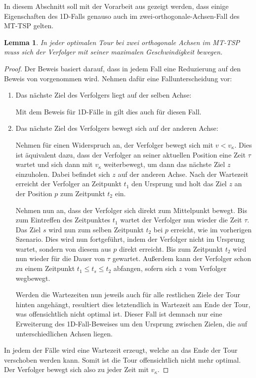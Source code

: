 \documentclass[german,version-2019-11]{uzl-thesis}
\newtheorem{lem}{Lemma}
\begin{document}
In diesem Abschnitt soll mit der Vorarbeit aus \cite{helvig} gezeigt werden, dass einige Eigenschaften des 1D-Falls genauso auch im zwei-orthogonale-Achsen-Fall des MT-TSP gelten.

\begin{lem}
\label{lem:1}
In jeder optimalen Tour bei zwei orthogonale Achsen im MT-TSP muss sich der Verfolger mit seiner  maximalen Geschwindigkeit bewegen.
\end{lem}
 
\begin{proof}
Der Beweis basiert darauf, dass in jedem Fall eine Reduzierung auf den Beweis von \cite{helvig} vorgenommen wird. Nehmen dafür eine Fallunterscheidung vor:
\begin{enumerate}
\item Das nächste Ziel des Verfolgers liegt auf der selben Achse:

Mit dem Beweis für 1D-Fälle in \cite{helvig} gilt dies auch für diesen Fall.\\

\item Das nächste Ziel des Verfolgers bewegt sich auf der anderen Achse: 

Nehmen für einen Widerspruch an, der Verfolger bewegt sich mit $v < v_{\kappa}$. Dies ist äquivalent dazu, dass der Verfolger an seiner aktuellen Position eine Zeit $\tau$ wartet und sich dann mit $v_{\kappa}$ weiterbewegt, um dann das nächste Ziel $z$ einzuholen. Dabei befindet sich $z$ auf der anderen Achse. Nach der Wartezeit erreicht der Verfolger an Zeitpunkt $t_1$ den Ursprung und holt das Ziel $z$ an der Position $p$ zum Zeitpunkt $t_2$ ein. 

Nehmen nun an, dass der Verfolger sich direkt zum Mittelpunkt bewegt. Bis zum Eintreffen des Zeitpunktes $t_1$ wartet der Verfolger nun wieder die Zeit $\tau$. Das Ziel $s$ wird nun zum selben Zeitpunkt $t_2$ bei $p$ erreicht, wie im vorherigen Szenario. Dies wird nun fortgeführt, indem der Verfolger nicht im Ursprung wartet, sondern von diesem aus $p$ direkt erreicht. Bis zum Zeitpunkt $t_2$ wird nun wieder für die Dauer von $\tau$ gewartet. Außerdem kann der Verfolger schon zu einem Zeitpunkt $t_1 \leq t_{s} \leq t_2$ abfangen, sofern sich $z$ vom Verfolger wegbewegt. 

Werden die Wartezeiten nun jeweils auch für alle restlichen Ziele der Tour hinten angehängt, resultiert dies letztendlich in Wartezeit am Ende der Tour, was offensichtlich nicht optimal ist. Dieser Fall ist demnach nur eine Erweiterung des 1D-Fall-Beweises um den Ursprung zwischen Zielen, die auf unterschiedlichen Achsen liegen. 
\end{enumerate}
In jedem der Fälle wird eine Wartezeit erzeugt, welche an das Ende der Tour verschoben werden kann. Somit ist die Tour offensichtlich nicht mehr optimal. Der Verfolger bewegt sich also zu jeder Zeit mit $v_{\kappa}$.
\end{proof}
\end{document}
